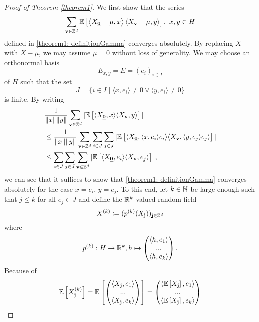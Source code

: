 
\begin{proof}[Proof of Theorem \ref{theorem1}]
    We first show that the series
    \[ \sum\limits_{\mathbf{v} \in \ZZ^d} \EE{ \left\langle X_{\usbf[0]} - \mu, x \right\rangle \left\langle X_{\mathbf{v}} - \mu, y \right\rangle}
    , \ x, y \in H \]
    defined in \eqref{theorem1: definitionGamma} converges absolutely.
    By replacing $X$ with $X - \mu$, we may assume $\mu = 0$ without loss of generality.
    We may choose an orthonormal basis 
    \[ E_{x, y} = E = (e_i)_{i \in I} \] 
    of $H$ such that the set
    \[ J = \{ i \in I \mid \langle x, e_i \rangle \neq 0 \lor \langle y, e_i \rangle \neq 0 \} \]
    is finite. By writing
    \begin{align*}
        & \frac{1}{\|x\| \|y\|} \sum\limits_{\mathbf{v} \in \ZZ^d} | \EE{\langle X_{\usbf[0]}, x \rangle \langle X_\mathbf{v}, y \rangle }| \\
        & \leq \frac{1}{\|x\| \|y\|} \sum\limits_{\mathbf{v} \in \ZZ^d} \sum\limits_{i \in J} \sum\limits_{j \in J} | \EE{\langle X_{\usbf[0]}, \langle x, e_i \rangle e_i \rangle \langle X_\mathbf{v}, \langle y, e_j \rangle e_j \rangle }| \\
        & \leq \sum\limits_{i \in J} \sum\limits_{j \in J} \sum\limits_{\mathbf{v} \in \ZZ^d}  | \EE{\langle X_{\usbf[0]}, e_i \rangle \langle X_\mathbf{v}, e_j \rangle }|,
    \end{align*}
    we can see that it suffices to show that \eqref{theorem1: definitionGamma} converges absolutely for the case $x = e_i$, $y = e_j$. To this end, let $k \in \mathbb{N}$ be large enough such that $j \leq k$ for all $e_j \in J$ and define the $\mathbb{R}^k$-valued random field 
    \[ X^{(k)} \coloneqq (p^{(k)}(X_\mathbf{j}))_{\mathbf{j} \in \mathbb{Z}^d} \] 
    where
    \[ p^{(k)}: H \to \mathbb{R}^k, h \mapsto \begin{pmatrix} \langle h, e_1 \rangle \\ ... \\ \langle h, e_k \rangle \end{pmatrix}. \]
    Because of 
    \begin{align*}
        \EE{X^{(k)}_\mathbf{j}} 
         = \EE{\begin{pmatrix} \langle X_\mathbf{j}, e_1 \rangle \\ ... \\ \langle X_\mathbf{j}, e_k \rangle \end{pmatrix}} %
         = \begin{pmatrix} \langle \EE{X_\mathbf{j}}, e_1 \rangle \\ ... \\ \langle \EE{X_\mathbf{j}}, e_k \rangle \end{pmatrix} %

\end{align*}
\end{proof}
